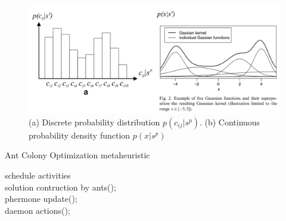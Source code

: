 \begin{figure}
\centering
\includegraphics[width=\textwidth]{ACOR_gaussianKernel}
\caption{(a) Discrete probability distribution $p(c_{ij}|s^{p})$. (b) Continuous probability density function $p(x|s^{p})$}\label{fig:ACOR_gaussianKernel}
\end{figure}

\begin{algorithm}%
\caption{Ant Colony Optimization metaheuristic}\label{algo:ACO}
 {

    schedule activities \\
    solution contruction by ants(); \\
    phermone update(); \\
    daemon actions(); \\
}
\end{algorithm}



